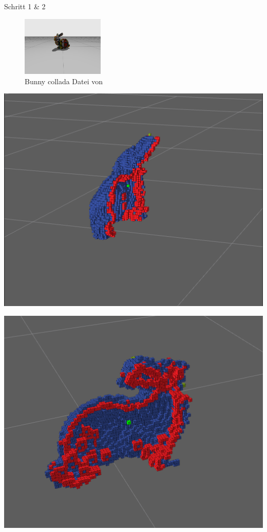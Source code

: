 \documentclass{beamer}
\begin{document}
\begin{frame}{Schritt 1 \& 2}
	\vspace{-0.4cm}
	\begin{figure}
		\centering
		\includegraphics[width=0.35\textwidth]{Graphics/bunny.png}
		\caption{Bunny collada Datei von \cite{delmerico_comparison_2018}}
	\end{figure}
	\vspace{-0.2cm}
	\centering
	\begin{minipage}{0.4\textwidth}
		\includegraphics[width=\textwidth]{Graphics/frontiers_side.png}
	\end{minipage}
	\begin{minipage}{0.4\textwidth}
		\includegraphics[width=\textwidth]{Graphics/frontiers_behind.png}
	\end{minipage}

\end{frame}
\end{document}
